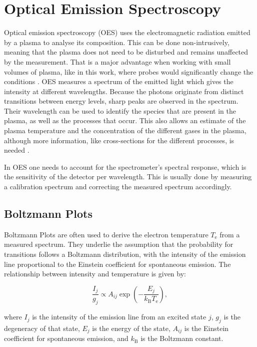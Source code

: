 \section{Optical Emission Spectroscopy}
Optical emission spectroscopy (OES) uses the electromagnetic radiation emitted by a plasma to analyse its composition. This can be done non-intrusively, meaning that the plasma does not need to be disturbed and remains unaffected by the measurement. That is a major advantage when working with small volumes of plasma, like in this work, where probes would significantly change the conditions \cite{plasma2}. OES measures a spectrum of the emitted light which gives the intensity at different wavelengths. Because the photons originate from distinct transitions between energy levels, sharp peaks are observed in the spectrum. Their wavelength can be used to identify the species that are present in the plasma, as well as the processes that occur. This also allows an estimate of the plasma temperature and the concentration of the different gases in the plasma, although more information, like cross-sections for the different processes, is needed \cite{plasma2}. 

In OES one needs to account for the spectrometer's spectral response, which is the sensitivity of the detector per wavelength. This is usually done by measuring a calibration spectrum and correcting the measured spectrum accordingly.

\subsection{Boltzmann Plots}
\label{sec:boltzmann}
Boltzmann Plots are often used to derive the electron temperature $ T_\text{e} $ from a measured spectrum. They underlie the assumption that the probability for transitions follows a Boltzmann distribution, with the intensity of the emission line proportional to the Einstein coefficient for spontaneous emission. The relationship between intensity and temperature is given by:

\begin{equation}
    \frac{I_j}{g_j} \propto A_{ij} \exp\left( - \frac{E_j}{k_\text{B} T_\text{e}} \right),
\end{equation}

where $ I_j $ is the intensity of the emission line from an excited state $ j $, $ g_j $ is the degeneracy of that state, $ E_j $ is the energy of the state, $ A_{ij} $ is the Einstein coefficient for spontaneous emission, and $ k_\text{B} $ is the Boltzmann constant. 

